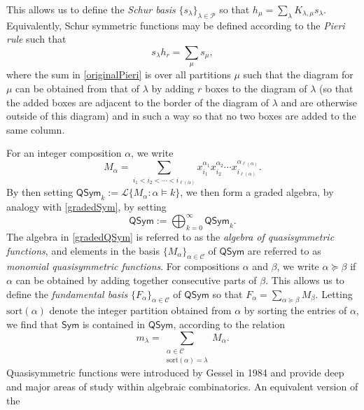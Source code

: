 \documentclass{amsart}
\theoremstyle{definition}
\begin{document}
 This allows us to define the \emph{Schur basis} $\{ s_{\lambda} \}_{\lambda \in \mathcal{P}}$ so that $ h_{\mu} = \sum_{\lambda} 
 K_{\lambda, \mu} s_{\lambda}$. Equivalently, Schur symmetric functions may be defined according to the \emph{Pieri rule} such that
\begin{equation}\label{originalPieri}
 s_{\lambda} h_{r}
 = \sum_{\mu} s_{\mu}, 
\end{equation}
 where the sum in \eqref{originalPieri} is over all partitions $\mu$
 such that the diagram
 for $\mu$ can be obtained
 from that of $\lambda$ by adding $r$ boxes to the diagram of $\lambda$ (so that the added boxes are adjacent to the border of the diagram of $\lambda$ and are otherwise outside of this diagram) and in such a way so that no two boxes are added to the same column. 

 For an integer composition $\alpha$, we write
\begin{equation}\label{quasimonomial}
 M_{\alpha} = \sum_{i_{1} < i_{2} < \cdots < i_{\ell(\alpha)}}
 x_{i_{1}}^{\alpha_{1}} 
 x_{i_{2}}^{\alpha_{2}} \cdots 
x_{i_{\ell(\alpha)}}^{\alpha_{\ell(\alpha)}}. 
\end{equation}
 By then setting $\textsf{QSym}_{k} := \mathscr{L}\{ M_{\alpha} : \alpha \vDash k \}$, we then form a graded algebra, by analogy with 
 \eqref{gradedSym}, by setting 
\begin{equation}\label{gradedQSym}
 \textsf{QSym} :=
 \bigoplus_{k=0}^{\infty} 
 \textsf{QSym}_{k}.
\end{equation}
 The algebra in \eqref{gradedQSym} is referred to as the \emph{algebra of quasisymmetric functions}, and elements in the basis $\{ 
 M_{\alpha} \}_{\alpha \in \mathcal{C}}$ of $\textsf{QSym}$ are referred to as \emph{monomial quasisymmetric functions}. For 
 compositions $\alpha$ and $\beta$, we write $\alpha \succeq \beta$ if $\alpha$ can be obtained by adding together consecutive parts 
 of $\beta$. This allows us to define the \emph{fundamental basis} $\{ F_{\alpha} \}_{\alpha \in \mathcal{C}}$ of $\textsf{QSym}$ so that 
 $ F_{\alpha} = \sum_{\alpha \succeq \beta} M_{\beta}$. Letting $\text{sort}(\alpha)$ denote the integer partition obtained from $\alpha$ 
 by sorting the entries of $\alpha$, we find that $\textsf{Sym}$ is contained in $\textsf{QSym}$, according to the relation $$ m_{\lambda} 
 = \sum_{ \substack{\alpha \in \mathcal{C} \\ \text{sort}(\alpha) = \lambda} } M_{\alpha}. $$ Quasisymmetric functions were introduced by 
 Gessel in 1984 \cite{Gessel1984} and provide deep and major areas of study within algebraic combinatorics. An equivalent version of the 
\end{document}
